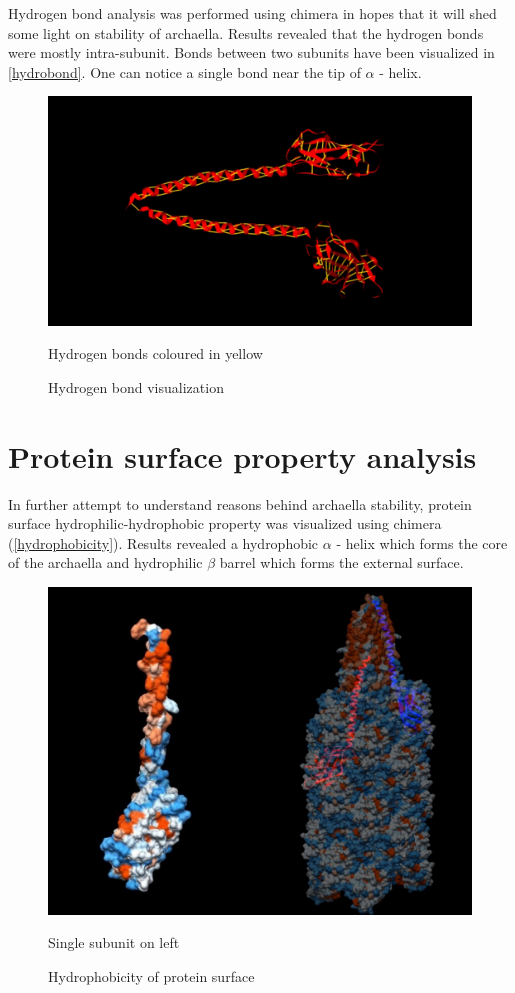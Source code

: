 \documentclass[fontsize=12pt,headsepline=true, bibliography=totocnumbered, twoside]{scrbook} %
\begin{document}
Hydrogen bond analysis was performed using chimera in hopes that it will shed some light on stability of archaella. Results revealed that the hydrogen bonds were mostly intra-subunit. Bonds between two subunits have been visualized in \autoref{hydrobond}. One can notice a single bond near the tip of $\alpha$ - helix.




\begin{figure}[h]
\center
\includegraphics[width=0.8\linewidth]{hydrobond}
\caption{Hydrogen bond visualization}
Hydrogen bonds coloured in yellow
\label{hydrobond}
\end{figure}




\section{Protein surface property analysis}

In further attempt to understand reasons behind archaella stability, protein surface hydrophilic-hydrophobic property was visualized using chimera (\autoref{hydrophobicity}). Results revealed a hydrophobic $\alpha$ - helix which forms the core of the archaella and hydrophilic $\beta$ barrel which forms the external surface.

\begin{figure}[]
\center
\includegraphics[width=0.85\linewidth]{hydro}
\caption{Hydrophobicity of protein surface}
Single subunit on left
\label{hydrophobicity}
\end{figure}
\end{document}
